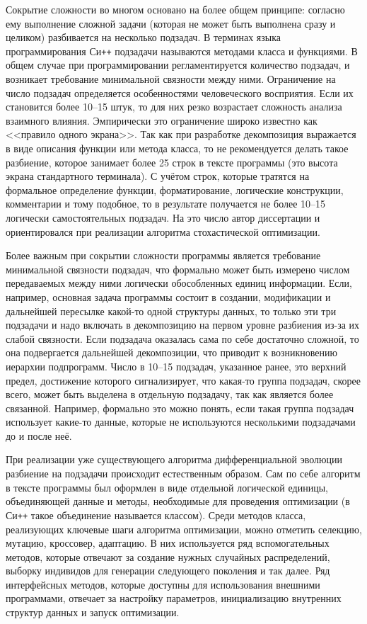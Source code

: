Сокрытие сложности во многом основано на более общем принципе:
согласно ему выполнение сложной задачи (которая не может быть
выполнена сразу и целиком) разбивается на несколько подзадач. В
терминах языка программирования Си\texttt{++} подзадачи называются
методами класса и функциями.  В общем случае при программировании
регламентируется количество подзадач, и возникает требование
минимальной связности между ними.  Ограничение на число подзадач
определяется особенностями человеческого восприятия. Если их 
становится более 10--15 штук, то для них резко возрастает сложность анализа 
взаимного влияния.  Эмпирически это ограничение широко известно как
<<правило одного экрана>>.  Так как при разработке декомпозиция
выражается в виде описания функции или метода класса, то не
рекомендуется делать такое разбиение, которое занимает более 25 строк
в тексте программы (это высота экрана стандартного
терминала).  С учётом строк, которые тратятся на формальное определение
функции, форматирование, логические конструкции, комментарии и тому
подобное, то в результате получается не более 10--15 логически
самостоятельных подзадач. На это число автор диссертации и
ориентировался при реализации алгоритма стохастической оптимизации.


Более важным при сокрытии сложности программы является требование
минимальной связности подзадач, что формально может быть
измерено числом передаваемых между ними логически обособленных единиц информации.
Если, например, основная задача программы
состоит в создании, модификации и дальнейшей пересылке какой-то одной
структуры данных, то только эти три подзадачи и надо включать в
декомпозицию на первом уровне разбиения из-за их слабой связности. Если
подзадача оказалась сама по себе достаточно сложной, то она
подвергается дальнейшей декомпозиции, что приводит к возникновению
иерархии подпрограмм.  Число в 10--15 подзадач, указанное ранее, это
верхний предел, достижение которого сигнализирует, что какая-то
группа подзадач, скорее всего, может быть выделена в отдельную подзадачу,
так как является более связанной. Например, формально это можно
понять, если такая группа подзадач использует какие-то данные, которые
не используются несколькими подзадачами до и после неё.

При реализации уже существующего алгоритма дифференциальной эволюции
разбиение на подзадачи происходит естественным образом. Сам по себе
алгоритм в тексте программы был оформлен в виде отдельной логической
единицы, объединяющей  данные и методы, необходимые
для проведения оптимизации (в Си\texttt{++} такое
объединение называется классом). Среди методов класса, реализующих
ключевые шаги алгоритма оптимизации, можно отметить селекцию, мутацию,
кроссовер, адаптацию. В них используется ряд вспомогательных методов,
которые отвечают за создание нужных случайных распределений, выборку
индивидов для генерации следующего поколения и так далее. Ряд
интерфейсных методов, которые доступны для использования внешними
программами, отвечает за настройку параметров,
инициализацию внутренних структур данных и запуск оптимизации.

